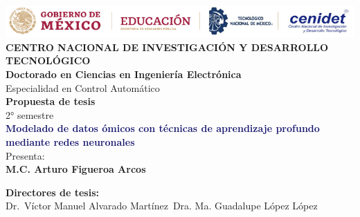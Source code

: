 \begin{titlepage}
    \begin{center}
        \noindent \includegraphics[width=\textwidth]{Imagenes/logos latex.PNG} \\[2cm] %
        \textbf{{\Huge CENTRO NACIONAL DE INVESTIGACIÓN Y DESARROLLO TECNOLÓGICO}}\\[1cm]
        
        \textbf{\Large{Doctorado en Ciencias en Ingeniería Electrónica}}\\
        {\large Especialidad en Control Automático}\\[1cm]
        
        \textbf{{\Large Propuesta de tesis}}\\
        {\large 2° semestre}\\[1cm]
              
        \textbf{\Large{\textcolor{MidnightBlue}{Modelado de datos ómicos con técnicas de aprendizaje profundo mediante redes neuronales}}}\\[1cm]
        
        {\large Presenta:}\\
        \textbf{{\Large M.C. Arturo Figueroa Arcos}}\\[1cm]
    
    \end{center}
    \begin{minipage}{0.46\textwidth}								
        \begin{flushleft}
        \begin{center}
    
            \textbf{Directores de tesis:}\\
        
            Dr.\ Víctor Manuel Alvarado Martínez\
            Dra. Ma. Guadalupe López López\\
            
    \end{center}
    \end{flushleft}
    \end{minipage}		
    \begin{minipage}{0.52\textwidth}		
    \vspace{0cm}
    \begin{flushright}															%
    \begin{center}
    

\end{center}
\end{flushright}
\end{minipage}
\end{titlepage}

